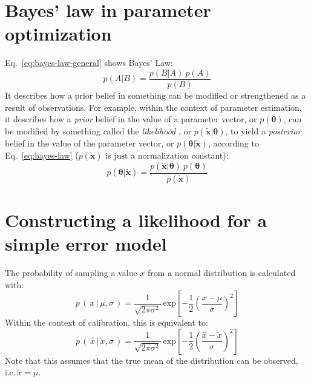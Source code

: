 \section{Bayes' law in parameter optimization}

Eq.~\ref{eq:bayes-law-general} shows Bayes' Law:
\begin{equation}\label{eq:bayes-law-general}
p(A|B) = \frac{p(B|A)\:p(A)}{p(B)}
\end{equation}
It describes how a prior belief in something can be modified or strengthened as
a result of observations. For example, within the context of parameter
estimation, it describes how a \textit{prior} belief in the value of a parameter
vector, or $p(\boldsymbol\theta)$, can be modified by something called the
\textit{likelihood} , or $p(\tilde{\mathbf{x}}|\boldsymbol\theta)$, to yield a
\textit{posterior} belief in the value of the parameter vector, or
$p(\boldsymbol\theta|\tilde{\mathbf{x}})$,  according to Eq.~\ref{eq:bayes-law}
($p(\tilde{\mathbf{x}})$ is just a normalization constant):
\begin{equation}\label{eq:bayes-law}
p(\boldsymbol\theta|\tilde{\mathbf{x}}) =
\frac{p(\tilde{\mathbf{x}}|\boldsymbol\theta)\:p(\boldsymbol\theta)}{p(\tilde{\mathbf{x}})}
\end{equation}

\section{Constructing a likelihood for a simple error model}
The probability of sampling a value $x$ from a normal distribution  is
calculated with:
\begin{equation}\label{eq:normal-distribution}
p\,(\,x\,|\,\mu,\sigma\,) =
\frac{1}{\sqrt{2\pi\sigma^2}}\:
\mathrm{exp}\left[{-\frac{1}{2}
\left(\frac{x-\mu}{\sigma}\right)^2}\right]
\end{equation}
Within the context of calibration, this is equivalent to:
\begin{equation}\label{eq:normal-distribution-calibration}
p\,(\,\hat{x}\,|\,\tilde{x},\sigma\,) =
\frac{1}{\sqrt{2\pi\sigma^2}}\:
\mathrm{exp}\left[{-\frac{1}{2}\left(\frac{\hat{x}-\tilde{x}}{\sigma}\right)^2}\right]
\end{equation}
Note that this assumes that the true mean of the distribution can be observed,
i.e.\,$\tilde{x}=\mu$.

